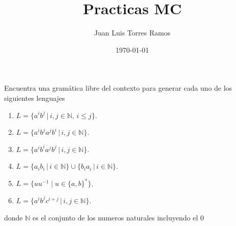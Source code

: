\documentclass{article}
\title{Practicas MC}
\date{\today}
\author{Juan Luis Torres Ramos}
\begin{document}
    \maketitle
    \newpage

    \section{}
    Encuentra una gramática libre del contexto para generar cada uno de los siguientes lenguajes

    \begin{enumerate}
        \item $L = \{a^i b^j \, | \, i, j \in \mathbb{N}, \, i \leq j\}$.
        \item $L = \{a^i b^j a^j b^i \, | \, i, j \in \mathbb{N}\}$.
        \item $L = \{a^i b^i a^j b^j \, | \, i, j \in \mathbb{N}\}$.
        \item $L = \{a_i b_i \,|\, i \in \mathbb{N}\} \cup \{b_i a_i \,|\, i \in \mathbb{N\}}$.
        \item $L = \{uu^{-1} \mid u \in \{a, b\}^*\}$.
        \item $L = \{a^i b^j c^{i+j} \, | \, i, j \in \mathbb{N}\}$.    
    \end{enumerate}

    \begin{flushleft}
        donde $\mathbb{N}$ es el conjunto de los numeros naturales incluyendo el 0
    \end{flushleft}

    
\end{document}
